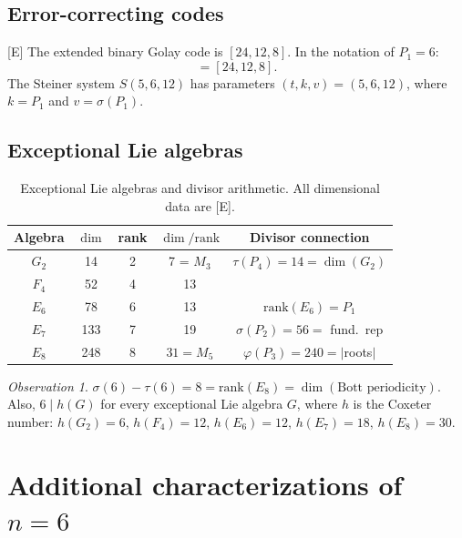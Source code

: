 \documentclass[11pt,letterpaper]{article}
\theoremstyle{definition}
\theoremstyle{remark}
\newtheorem*{observation}{Observation}
\newcommand{\established}{\textsf{[E]}}
\begin{document}
\subsection{Error-correcting codes}

\established{} The extended binary Golay code is $[24, 12, 8]$.
In the notation of $P_1 = 6$:
\begin{equation}
[\sigma(6)\varphi(6),\; \sigma(6),\; \sigma(6) - \tau(6)] = [24, 12, 8].
\end{equation}
The Steiner system $S(5, 6, 12)$ has parameters $(t, k, v) = (5, 6, 12)$, 
where $k = P_1$ and $v = \sigma(P_1)$.

\subsection{Exceptional Lie algebras}

\begin{table}[ht]
\centering
\caption{Exceptional Lie algebras and divisor arithmetic.  
All dimensional data are \established.}
\label{tab:lie}
\begin{tabular}{@{}ccccc@{}}
\toprule
Algebra & $\dim$ & rank & $\dim/\text{rank}$ & Divisor connection \\
\midrule
$G_2$ & 14 & 2 & 7 = $M_3$ & $\tau(P_4) = 14 = \dim(G_2)$ \\
$F_4$ & 52 & 4 & 13 & \\
$E_6$ & 78 & 6 & 13 & $\mathrm{rank}(E_6) = P_1$ \\
$E_7$ & 133 & 7 & 19 & $\sigma(P_2) = 56 = $ fund.\ rep \\
$E_8$ & 248 & 8 & $31 = M_5$ & $\varphi(P_3) = 240 = |$roots$|$ \\
\bottomrule
\end{tabular}
\end{table}

\begin{observation}
$\sigma(6) - \tau(6) = 8 = \mathrm{rank}(E_8) = \dim(\text{Bott periodicity})$.
Also, $6 \mid h(G)$ for every exceptional Lie algebra $G$, where $h$ is the 
Coxeter number: $h(G_2) = 6$, $h(F_4) = 12$, $h(E_6) = 12$, $h(E_7) = 18$, $h(E_8) = 30$.
\end{observation}

\section{Additional characterizations of $n=6$}
\label{sec:additional}
\end{document}
